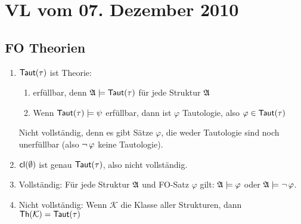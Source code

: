 \section{VL vom 07. Dezember 2010}

\subsection{FO Theorien}

\begin{enumerate}
  \item $\operatorname{\text{\textsf{Taut}}}(\tau)$ ist Theorie:
  \begin{enumerate}
    \item erfüllbar, denn $\mathfrak{A}\models\operatorname{\text{\textsf{Taut}}}(\tau)$ für jede Struktur $\mathfrak{A}$
    \item Wenn $\operatorname{\text{\textsf{Taut}}}(\tau)\models\psi$ erfüllbar, dann ist $\varphi$ Tautologie, also $\varphi\in\operatorname{\text{\textsf{Taut}}}(\tau)$
  \end{enumerate}
  
  Nicht vollständig, denn es gibt Sätze $\varphi$, die weder Tautologie sind noch unerfüllbar
  (also $\operatorname{\neg}\varphi$ keine Tautologie).
  
  \item $\operatorname{\text{\textsf{cl}}}(\emptyset)$ ist genau $\operatorname{\text{\textsf{Taut}}}(\tau)$, also nicht vollständig.
  
  \item Vollständig: Für jede Struktur $\mathfrak{A}$ und FO-Satz $\varphi$ gilt: $\mathfrak{A}\models\varphi$ oder $\mathfrak{A}\models\operatorname{\neg}\varphi$.
  
  \item Nicht vollständig: Wenn $\mathcal{K}$ die Klasse aller Strukturen, dann $\operatorname{\text{\textsf{Th}}}(\mathcal{K}) = \operatorname{\text{\textsf{Taut}}}(\tau)$
\end{enumerate}


